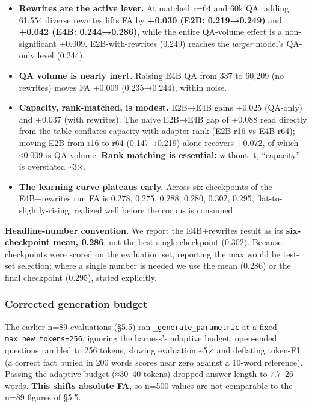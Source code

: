 \begin{itemize}
\tightlist
\item
  \textbf{Rewrites are the active lever.} At matched r=64 and 60k QA, adding 61,554 diverse rewrites lifts FA by \textbf{+0.030 (E2B: 0.219→0.249)} and \textbf{+0.042 (E4B: 0.244→0.286)}, while the entire QA-volume effect is a non-significant +0.009. E2B-with-rewrites (0.249) reaches the \emph{larger} model's QA-only level (0.244).
\item
  \textbf{QA volume is nearly inert.} Raising E4B QA from 337 to 60,209 (no rewrites) moves FA +0.009 (0.235→0.244), within noise.
\item
  \textbf{Capacity, rank-matched, is modest.} E2B→E4B gains +0.025 (QA-only) and +0.037 (with rewrites). The naive E2B→E4B gap of +0.088 read directly from the table conflates capacity with adapter rank (E2B r16 vs E4B r64); moving E2B from r16 to r64 (0.147→0.219) alone recovers +0.072, of which ≤0.009 is QA volume. \textbf{Rank matching is essential:} without it, ``capacity'' is overstated \textasciitilde3×.
\item
  \textbf{The learning curve plateaus early.} Across six checkpoints of the E4B+rewrites run FA is 0.278, 0.275, 0.288, 0.280, 0.302, 0.295, flat-to-slightly-rising, realized well before the corpus is consumed.
\end{itemize}

\textbf{Headline-number convention.} We report the E4B+rewrites result as its \textbf{six-checkpoint mean, 0.286}, not the best single checkpoint (0.302). Because checkpoints were scored on the evaluation set, reporting the max would be test-set selection; where a single number is needed we use the mean (0.286) or the final checkpoint (0.295), stated explicitly.

\hypertarget{corrected-generation-budget}{%
\subsubsection{Corrected generation budget}\label{corrected-generation-budget}}

The earlier n=89 evaluations (§5.5) ran \texttt{\_generate\_parametric} at a fixed \texttt{max\_new\_tokens=256}, ignoring the harness's adaptive budget; open-ended questions rambled to 256 tokens, slowing evaluation \textasciitilde5× and deflating token-F1 (a correct fact buried in 200 words scores near zero against a 10-word reference). Passing the adaptive budget (≈30--40 tokens) dropped answer length to 7.7--26 words. \textbf{This shifts absolute FA}, so n=500 values are not comparable to the n=89 figures of §5.5.


